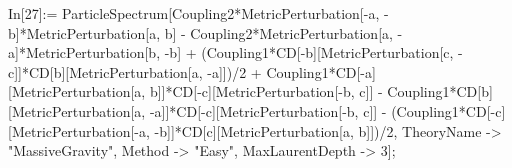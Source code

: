 In[27]:= ParticleSpectrum[Coupling2*MetricPerturbation[-a, -b]*MetricPerturbation[a, b] - Coupling2*MetricPerturbation[a, -a]*MetricPerturbation[b, -b] + (Coupling1*CD[-b][MetricPerturbation[c, -c]]*CD[b][MetricPerturbation[a, -a]])/2 + Coupling1*CD[-a][MetricPerturbation[a, b]]*CD[-c][MetricPerturbation[-b, c]] - Coupling1*CD[b][MetricPerturbation[a, -a]]*CD[-c][MetricPerturbation[-b, c]] - (Coupling1*CD[-c][MetricPerturbation[-a, -b]]*CD[c][MetricPerturbation[a, b]])/2, TheoryName -> "MassiveGravity", Method -> "Easy", MaxLaurentDepth -> 3]; 